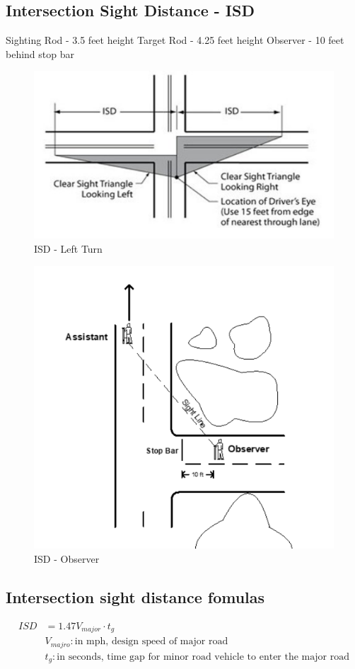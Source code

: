 \documentclass{article}
\begin{document}
  \subsection{Intersection Sight Distance - ISD} 
  Sighting Rod - 3.5 feet height
  Target Rod - 4.25 feet height
  Observer - 10 feet behind stop bar

  \begin{figure}
    \includegraphics[width=0.7\linewidth]{ISD_leftturn.png}
    \caption{ISD - Left Turn}
    \label{fig:image-isd-leftturn}
  \end{figure}

  \begin{figure}
    \includegraphics[width=0.7\linewidth]{ISD_observer.png}
    \caption{ISD - Observer}
    \label{fig:image-isd-observer}
  \end{figure}

  \subsection{Intersection sight distance fomulas}

  \begin{align*}
    ISD & = 1.47 V_{major} \cdot t_g \\
    & V_{majro}: \text{in mph, design speed of major road} \\
    & t_g: \text{in seconds, time gap for minor road vehicle to enter the major road} \\
  \end{align*}
\end{document}
